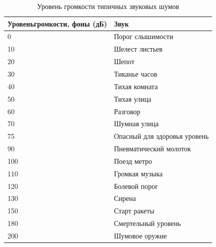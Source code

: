 \begin{table}[H]
\centering
\caption{Уровень громкости типичных звуковых шумов}
\begin{tabular}{p{5cm} p{5.5cm}}
\toprule
{Уровень\hspace{0.2em}громкости}, фоны (дБ) & Звук \\ \midrule
 0 &	Порог слышимости 	\\
 10 &	Шелест листьев 	\\
 20 &	Шепот 	\\
 30 &	Тиканье часов 	\\
 40 &	Тихая комната 	\\
 50 &	Тихая улица 	\\
 60 &	Разговор 	\\
 70 &	Шумная улица 	\\
 75 &	Опасный для здоровья уро­вень 	\\
 90 &	Пневматический молоток 	\\
 100 &	Поезд метро 	\\
 110 &	Громкая музыка 	\\
 120 &	Болевой порог 	\\
 130 &	Сирена 	\\
 150 &	Старт ракеты 	\\
 180 &	Смертельный уровень 	\\
 200 &	Шумовое оружие 	\\\bottomrule
\end{tabular}
\end{table}

